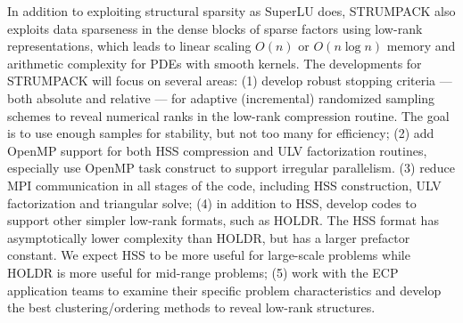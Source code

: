 In addition to exploiting structural sparsity as SuperLU does, STRUMPACK
also exploits data sparseness in the dense blocks of sparse factors using
low-rank representations, which leads to linear scaling $O(n)$ or $O(n \log n)$
memory and arithmetic complexity for PDEs with smooth kernels.
The developments for STRUMPACK will focus on several areas:
(1) develop robust stopping criteria --- both absolute and relative --- for
    adaptive (incremental) randomized sampling schemes to reveal numerical
    ranks in the low-rank compression routine. The goal is to use
    enough samples for stability, but not too many for efficiency;
(2) add OpenMP support for both HSS compression and ULV factorization routines,
    especially use OpenMP task construct to support irregular parallelism.
(3) reduce MPI communication in all stages of the code, including HSS
    construction, ULV factorization and triangular solve;
(4) in addition to HSS, develop codes to support other simpler low-rank
    formats, such as HOLDR. The HSS format has asymptotically lower complexity
    than HOLDR, but has a larger prefactor constant. We expect HSS to be more
    useful for large-scale problems while HOLDR is more useful for mid-range
    problems;
(5) work with the ECP application teams to examine their specific problem
    characteristics and develop the best clustering/ordering methods to 
    reveal low-rank structures.

